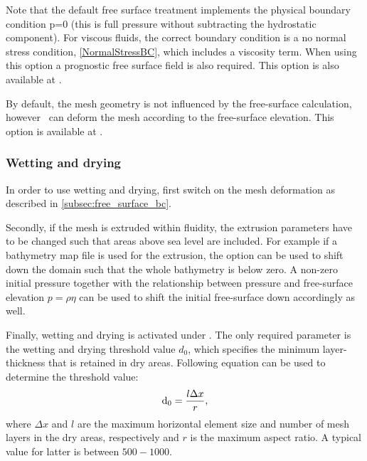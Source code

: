 Note that the default free surface treatment implements the physical boundary
condition p=0 (this is full pressure without subtracting the hydrostatic
component). For viscous fluids, the correct boundary condition is a no normal
stress condition, \eqref{NormalStressBC}, which includes a viscosity term. When using this option a prognostic free surface field is also required. This option is also available at .

By default, the mesh geometry is not influenced by the free-surface calculation, however \fluidity\ can deform the mesh according to the free-surface elevation.
This option is available at .

\subsubsection{Wetting and drying}\label{subsec:wetting_drying_bc}

In order to use wetting and drying, first switch on the mesh deformation as described in \ref{subsec:free_surface_bc}.

Secondly, if the mesh is extruded within fluidity, the extrusion parameters have to be changed such that areas above sea level are included.
For example if a bathymetry map file is used for the extrusion, the option 
can be used to shift down the domain such that the whole bathymetry is below zero.
A non-zero initial pressure together with the relationship between pressure and free-surface elevation $p = \rho \eta$ can be used to shift the initial free-surface down accordingly as well.

Finally, wetting and drying is activated under .
The only required parameter is the wetting and drying threshold value $d_0$, which specifies the minimum layer-thickness that is retained in dry areas.
Following equation can be used to determine the threshold value:
\begin{equation*}
\mathrm{d}_0 = \frac{l\Delta x}{r},
\end{equation*}
where $\Delta x$ and $l$ are the maximum horizontal element size and number of mesh layers in the dry areas, respectively and $r$ is the maximum aspect ratio. A typical value for latter is between $500-1000$.


